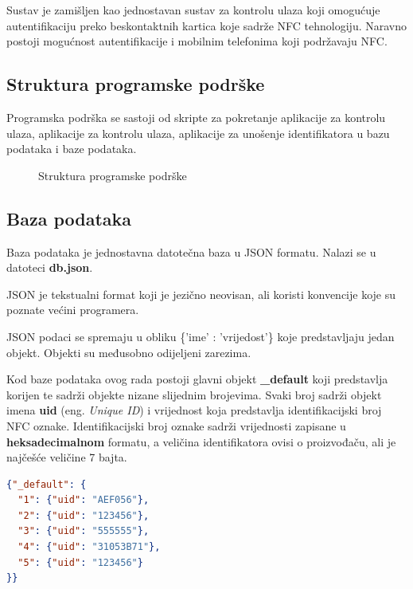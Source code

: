 \documentclass[times, utf8, zavrsni]{fer}
\begin{document}
Sustav je zamišljen kao jednostavan sustav za kontrolu ulaza koji omogućuje autentifikaciju preko beskontaktnih kartica koje sadrže NFC tehnologiju. Naravno postoji mogućnost autentifikacije i mobilnim telefonima koji podržavaju NFC. \par 

\subsection{Struktura programske podrške}
Programska podrška se sastoji od skripte za pokretanje aplikacije za kontrolu ulaza, aplikacije za kontrolu ulaza, aplikacije za unošenje identifikatora u bazu podataka i baze podataka.
\begin{figure}[H]
\caption{Struktura programske podrške}
\end{figure}

\subsection{Baza podataka}
Baza podataka je jednostavna datotečna baza u JSON formatu. Nalazi se u datoteci \textbf{db.json}.	\par
JSON je tekstualni format koji je jezično neovisan, ali koristi konvencije koje su poznate većini programera.\par
JSON podaci se spremaju u obliku \{'ime' : 'vrijedost'\} koje predstavljaju jedan objekt. Objekti su međusobno odijeljeni zarezima.\par 
Kod baze podataka ovog rada postoji glavni objekt \textbf{\_default} koji predstavlja korijen te sadrži objekte nizane slijednim brojevima. Svaki broj sadrži objekt imena \textbf{uid} (eng. \textit{Unique ID}) i vrijednost koja predstavlja identifikacijski broj NFC oznake. Identifikacijski broj oznake sadrži vrijednosti zapisane u \textbf{heksadecimalnom} formatu, a veličina identifikatora ovisi o proizvođaču, ali je najčešće veličine 7 bajta.

\begin{lstlisting}[language=json,firstnumber=1]
{"_default": {
  "1": {"uid": "AEF056"}, 
  "2": {"uid": "123456"},
  "3": {"uid": "555555"},
  "4": {"uid": "31053B71"},
  "5": {"uid": "123456"}
}}
\end{lstlisting}
\setlength{\parindent}{4ex}
\end{document}
